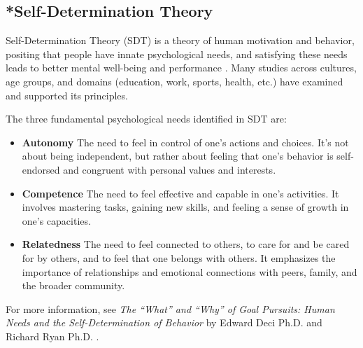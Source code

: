 \documentclass[12pt,letterpaper]{article}
\begin{document}
\subsection{*Self-Determination Theory}
\label{sec:sdt}
Self-Determination Theory (SDT) is a theory of human motivation and behavior, positing that people have innate psychological needs, and satisfying these needs leads to better mental well-being and performance \cite{deciSDT}. Many studies across cultures, age groups, and domains (education, work, sports, health, etc.) have examined and supported its principles.

The three fundamental psychological needs identified in SDT are:
\begin{itemize}
    \item \textbf{Autonomy} The need to feel in control of one's actions and choices. It's not about being independent, but rather about feeling that one's behavior is self-endorsed and congruent with personal values and interests.
    \item \textbf{Competence} The need to feel effective and capable in one's activities. It involves mastering tasks, gaining new skills, and feeling a sense of growth in one's capacities.
    \item \textbf{Relatedness} The need to feel connected to others, to care for and be cared for by others, and to feel that one belongs with others. It emphasizes the importance of relationships and emotional connections with peers, family, and the broader community.
\end{itemize}
For more information, see \textit{The “What” and “Why” of Goal Pursuits: Human Needs and the Self-Determination of Behavior} by Edward Deci Ph.D. and Richard Ryan Ph.D. \cite{deciSDT}.
\end{document}
